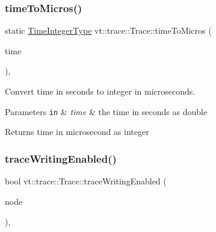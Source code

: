 \mbox{\label{structvt_1_1trace_1_1_trace_a4f271a172e5b1d3bfe7f61d9443b9146}} 
\subsubsection{\texorpdfstring{time\+To\+Micros()}{timeToMicros()}}
{\footnotesize\ttfamily static \hyperlink{structvt_1_1trace_1_1_trace_ab8db9218a8ab87f59773fcbf81433787}{Time\+Integer\+Type} vt\+::trace\+::\+Trace\+::time\+To\+Micros (\begin{DoxyParamCaption}\item[{double const}]{time }\end{DoxyParamCaption})\hspace{0.3cm}{\ttfamily [inline]}, {\ttfamily [static]}}



Convert time in seconds to integer in microseconds. 


\begin{DoxyParams}[1]{Parameters}
\mbox{\tt in}  & {\em time} & the time in seconds as double\\
\hline
\end{DoxyParams}
\begin{DoxyReturn}{Returns}
time in microsecond as integer 
\end{DoxyReturn}
\mbox{\label{structvt_1_1trace_1_1_trace_ad2511af5eeb837db4360a6e30b12aebb}} 
\subsubsection{\texorpdfstring{trace\+Writing\+Enabled()}{traceWritingEnabled()}}
{\footnotesize\ttfamily bool vt\+::trace\+::\+Trace\+::trace\+Writing\+Enabled (\begin{DoxyParamCaption}\item[{\hyperlink{namespacevt_a866da9d0efc19c0a1ce79e9e492f47e2}{Node\+Type}}]{node }\end{DoxyParamCaption})\hspace{0.3cm}{\ttfamily [static]}, {\ttfamily [private]}}



